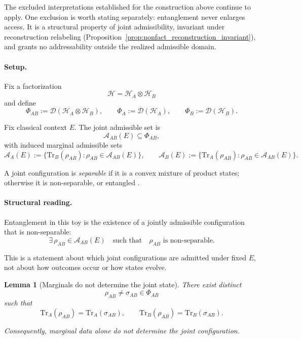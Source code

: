 \documentclass[aps,prx,onecolumn,11pt]{revtex4-2}
\theoremstyle{plain}
\newtheorem{lemma}{Lemma}
\theoremstyle{definition}
\theoremstyle{remark}
\begin{document}
The excluded interpretations established for the construction above
continue to apply. One exclusion is worth stating separately:
entanglement never enlarges access. It is a structural property of
joint admissibility, invariant under reconstruction relabeling
(Proposition~\ref{prop:nonfact_reconstruction_invariant}), and grants
no addressability outside the realized admissible domain.

\paragraph{Setup.}

Fix a factorization
\[
\mathcal H=\mathcal H_A\otimes\mathcal H_B
\]
and define
\[
\Phi_{AB}
:=
\mathcal D(\mathcal H_A\otimes\mathcal H_B),
\qquad
\Phi_A
:=
\mathcal D(\mathcal H_A),
\qquad
\Phi_B
:=
\mathcal D(\mathcal H_B).
\]

Fix classical context \(E\). The joint admissible set is
\begin{equation}
\mathcal A_{AB}(E)\subseteq\Phi_{AB},
\label{eq:toy_ent_joint_set}
\end{equation}
with induced marginal admissible sets
\begin{equation}
\mathcal A_A(E)
:=
\{
\mathrm{Tr}_B(\rho_{AB}):
\rho_{AB}\in\mathcal A_{AB}(E)
\},
\qquad
\mathcal A_B(E)
:=
\{
\mathrm{Tr}_A(\rho_{AB}):
\rho_{AB}\in\mathcal A_{AB}(E)
\}.
\label{eq:toy_ent_marginals}
\end{equation}

A joint configuration is \emph{separable} if it is a convex mixture of
product states; otherwise it is non-separable, or entangled
\cite{Horodecki2009,Watrous2018}.

\paragraph{Structural reading.}

Entanglement in this toy is the existence of a jointly admissible
configuration that is non-separable:
\[
\exists\,\rho_{AB}\in\mathcal A_{AB}(E)
\quad
\text{such that}
\quad
\rho_{AB}
\text{ is non-separable.}
\]

This is a statement about which joint configurations are admitted under
fixed \(E\), not about how outcomes occur or how states evolve.

\begin{lemma}[Marginals do not determine the joint state]
\label{lem:toy_ent_marginals_nondet}
There exist distinct
\[
\rho_{AB}\neq\sigma_{AB}\in\Phi_{AB}
\]
such that
\begin{equation}
\mathrm{Tr}_A(\rho_{AB})
=
\mathrm{Tr}_A(\sigma_{AB}),
\qquad
\mathrm{Tr}_B(\rho_{AB})
=
\mathrm{Tr}_B(\sigma_{AB}).
\label{eq:toy_ent_equal_marginals}
\end{equation}

Consequently, marginal data alone do not determine the joint
configuration.
\end{lemma}
\end{document}
